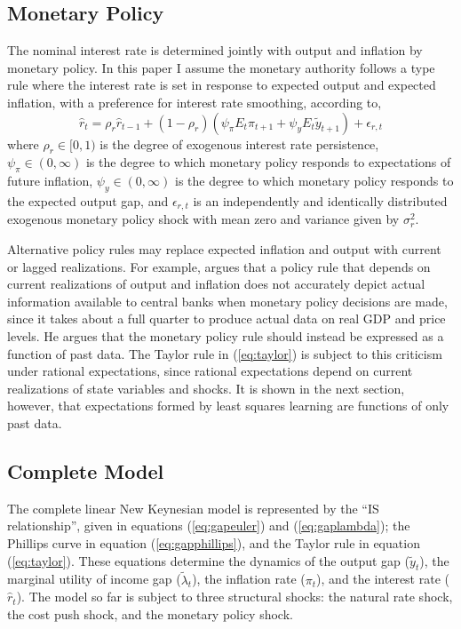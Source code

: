 \documentclass[12pt]{article}
\newcommand{\beq}{\begin{equation}}
\newcommand{\eeq}{\end{equation}}
\newcommand{\citee}[1]{\citet{#1}}
\newcommand{\h}[1]{\hat{#1}}
\begin{document}
\subsection{Monetary Policy}
The nominal interest rate is determined jointly with output and inflation by monetary policy.  In this paper I assume the monetary authority follows a \citee{taylor1993} type rule where the interest rate is set in response to expected output and expected inflation, with a preference for interest rate smoothing, according to,
\beq \label{eq:taylor} \h{r}_t = \rho_r \h{r}_{t-1} + (1-\rho_r) \left(\psi_{\pi} E_t \pi_{t+1} + \psi_y E_t \tilde{y}_{t+1} \right) + \epsilon_{r,t} \eeq
where $\rho_r \in [0,1)$ is the degree of exogenous interest rate persistence, $\psi_{\pi} \in (0,\infty)$ is the degree to which monetary policy responds to expectations of future inflation, $\psi_y \in (0,\infty)$ is the degree to which monetary policy responds to the expected output gap, and $\epsilon_{r,t}$ is an independently and identically distributed exogenous monetary policy shock with mean zero and variance given by $\sigma_r^2$.  

Alternative policy rules may replace expected inflation and output with current or lagged realizations.  For example, \citee{mccallum1997} argues that a policy rule that depends on current realizations of output and inflation does not accurately depict actual information available to central banks when monetary policy decisions are made, since it takes about a full quarter to produce actual data on real GDP and price levels.  He argues that the monetary policy rule should instead be expressed as a function of past data.  The Taylor rule in (\ref{eq:taylor}) is subject to this criticism under rational expectations, since rational expectations depend on current realizations of state variables and shocks.  It is shown in the next section, however, that expectations formed by least squares learning are functions of only past data.

\subsection{Complete Model}
The complete linear New Keynesian model is represented by the ``IS relationship'', given in equations (\ref{eq:gapeuler}) and (\ref{eq:gaplambda}); the Phillips curve in equation (\ref{eq:gapphillips}), and the Taylor rule in equation (\ref{eq:taylor}).  These equations determine the dynamics of the output gap ($\tilde{y}_t$), the marginal utility of income gap ($\tilde{\lambda}_t$), the inflation rate ($\pi_t$), and the interest rate ($\h{r}_t$).  The model so far is subject to three structural shocks: the natural rate shock, the cost push shock, and the monetary policy shock.
\end{document}
